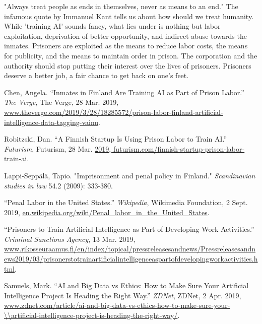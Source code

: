 \documentclass[10pt,a4paper]{article}
\begin{document}
	"Always treat people as ends in themselves, never as means to an end." The infamous quote by Immanuel Kant tells us about how should we treat humanity. While 'training AI' sounds fancy, what lies under is nothing but labor exploitation, deprivation of better opportunity, and indirect abuse towards the inmates. Prisoners are exploited as the means to reduce labor costs, the means for publicity, and the means to maintain order in prison. The corporation and the authority should stop putting their interest over the lives of prisoners. Prisoners deserve a better job, a fair chance to get back on one's feet.
	
	\newpage
	
	\begin{thebibliography}{9}
		Chen, Angela. “Inmates in Finland Are Training AI as Part of Prison Labor.” \textit{The Verge}, The Verge, 28 Mar. 2019, \url{www.theverge.com/2019/3/28/18285572/prison-labor-finland-artificial-intelligence-data-tagging-vainu}.
		
		Robitzski, Dan. “A Finnish Startup Is Using Prison Labor to Train AI.” \textit{Futurism}, Futurism, 28 Mar. \url{2019, futurism.com/finnish-startup-prison-labor-train-ai}.
		
		Lappi-Seppälä, Tapio. "Imprisonment and penal policy in Finland." \textit{Scandinavian studies in law} 54.2 (2009): 333-380.
		
		“Penal Labor in the United States.” \textit{Wikipedia}, Wikimedia Foundation, 2 Sept. 2019, \url{en.wikipedia.org/wiki/Penal_labor_in_the_United_States}.
		
		“Prisoners to Train Artificial Intelligence as Part of Developing Work Activities.” \textit{Criminal Sanctions Agency}, 13 Mar. 2019, \url{www.rikosseuraamus.fi/en/index/topical/pressreleasesandnews/Pressreleasesandnews2019/03/prisonerstotrainartificialintelligenceaspartofdevelopingworkactivities.html}.
		
		Samuels, Mark. “AI and Big Data vs Ethics: How to Make Sure Your Artificial Intelligence Project Is Heading the Right Way.” \textit{ZDNet}, ZDNet, 2 Apr. 2019,
		\url{www.zdnet.com/article/ai-and-big-data-vs-ethics-how-to-make-sure-your-\\artificial-intelligence-project-is-heading-the-right-way/}.
		
	\end{thebibliography}
\end{document}
